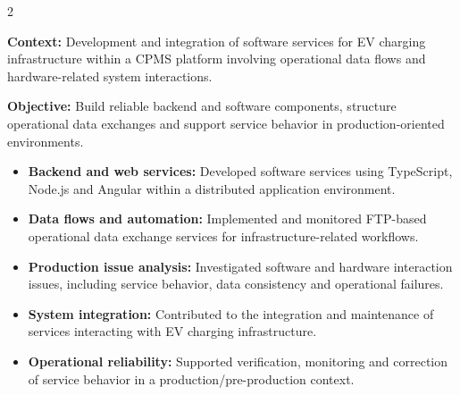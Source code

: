 \documentclass[8pt,a4paper,ragged2e,withhyper]{altacv}
\begin{document}



\makecvheader

\vspace{-0.3cm}


\begin{paracol}{2}



\textbf{Context:} Development and integration of software services for EV charging infrastructure within a CPMS platform involving operational data flows and hardware-related system interactions.

\textbf{Objective:} Build reliable backend and software components, structure operational data exchanges and support service behavior in production-oriented environments.

\begin{itemize}
\item \textbf{Backend and web services:} Developed software services using TypeScript, Node.js and Angular within a distributed application environment.
\item \textbf{Data flows and automation:} Implemented and monitored FTP-based operational data exchange services for infrastructure-related workflows.
\item \textbf{Production issue analysis:} Investigated software and hardware interaction issues, including service behavior, data consistency and operational failures.
\item \textbf{System integration:} Contributed to the integration and maintenance of services interacting with EV charging infrastructure.
\item \textbf{Operational reliability:} Supported verification, monitoring and correction of service behavior in a production/pre-production context.
\end{itemize}


\end{paracol}
\end{document}
